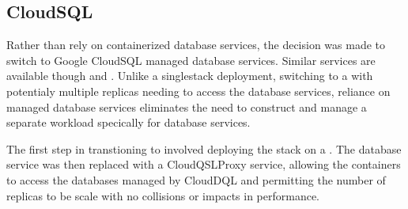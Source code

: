 \documentclass[letterpaper,12pt,english,openany,oneside]{sphinxmanual}
\begin{document}
\subsection{CloudSQL}
\label{\detokenize{euidev/infrastructure/index:cloudsql}}
\sphinxAtStartPar
Rather than rely on containerized database services, the decision was made to switch to Google CloudSQL managed database services. Similar services are available though  and . Unlike a single\sphinxhyphen{}stack  deployment, switching to a  with potentialy multiple replicas needing to access the database services, reliance on managed database services eliminates the need to construct and manage a separate workload specically for database services.

\sphinxAtStartPar
The first step in transtioning to  involved deploying the  stack on a  . The database service was then replaced with a CloudQSL\sphinxhyphen{}Proxy service, allowing the containers to access the databases managed by CloudDQL and permitting the number of replicas to be scale with no collisions or impacts in performance.
\end{document}
